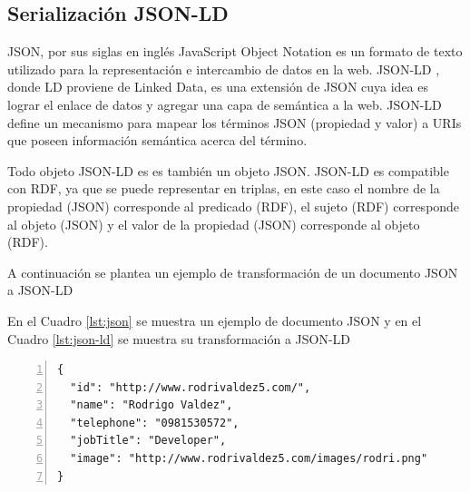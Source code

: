 \subsection{Serialización JSON-LD}

JSON, por sus siglas en inglés JavaScript Object Notation es un formato de texto utilizado para la representación e intercambio de datos en la web. JSON-LD \cite{JSONLDSy39:online}, donde LD proviene de Linked Data, es una extensión de JSON cuya idea es lograr el enlace de datos y agregar una capa de semántica a la web. JSON-LD define un mecanismo para mapear los términos JSON (propiedad y valor) a URIs que poseen información semántica acerca del término. 

Todo objeto JSON-LD es es también un objeto JSON. JSON-LD es compatible con RDF, ya que se puede representar en triplas, en este caso el nombre de la propiedad (JSON) corresponde al predicado (RDF), el sujeto (RDF) corresponde al objeto (JSON) y el valor de la propiedad (JSON) corresponde al objeto (RDF).

A continuación se plantea un ejemplo de transformación de un documento JSON a JSON-LD 

En el Cuadro \ref{lst:json} se muestra un ejemplo de documento JSON y en el Cuadro \ref{lst:json-ld} se muestra su transformación a JSON-LD


\lstset{
    language=json
}
\begin{lstlisting}[captionpos=b, caption=Ejemplo de un documento JSON, label=lst:json,  numbers=left,  numberstyle=\tiny\color{mygray},
    basicstyle=\tiny,frame=single]
{
  "id": "http://www.rodrivaldez5.com/",
  "name": "Rodrigo Valdez",
  "telephone": "0981530572",
  "jobTitle": "Developer",
  "image": "http://www.rodrivaldez5.com/images/rodri.png"
}
\end{lstlisting}

